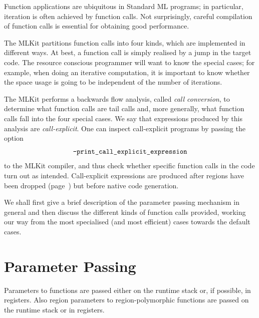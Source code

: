 \documentclass[12pt]{book}
\begin{document}
Function applications are ubiquitous in Standard ML programs; in
particular, iteration is often achieved by function calls. Not
surprisingly, careful compilation of function calls is essential for
obtaining good performance.

The MLKit partitions function calls into four kinds, which are
implemented in different ways.  At best, a function call is simply
realised by a jump in the target code.  The resource conscious
programmer will want to know the special cases; for example, when
doing an iterative computation, it is important to know whether the
space usage is going to be independent of the number of iterations.

The MLKit performs a backwards flow analysis, called 
%
{\em call conversion}, to determine what function calls are tail calls
and, more generally, what function calls fall into the four special
cases. We say that expressions produced by this analysis are
%
\label{call-explicit}%
{\em call-explicit}. One can inspect call-explicit programs by
passing the option
%
$$\hbox{\tt -print\_call\_explicit\_expression}$$
to the MLKit compiler,
and thus check whether specific function calls in the code turn out as
intended.  Call-explicit expressions are produced after regions have
been dropped (page~\pageref{bother-to-distinguish-get-n-put}) but
before native code generation.

We shall first give a brief description of the parameter passing
mechanism in general and then discuss the different kinds of function
calls provided, working our way from the most specialised (and most
efficient) cases towards the default cases.

\section{Parameter Passing}
Parameters to functions are passed either on the runtime
%
stack or, if possible, in
%
registers. Also region parameters to region-polymorphic functions are
passed on the runtime stack or in registers.
\end{document}
